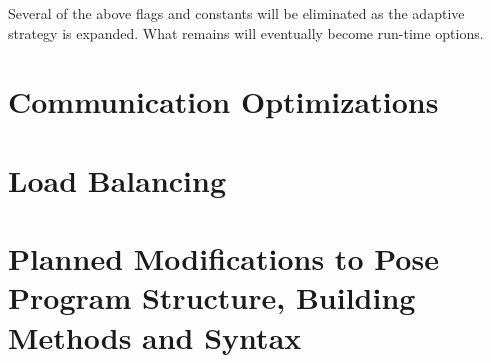 \documentclass[10pt]{article}
\newcommand{\pose}{{\sc Pose}}
\begin{document}
Several of the above flags and constants will be eliminated as the adaptive strategy is expanded.  What remains will eventually become run-time options.

\section{Communication Optimizations}

\section{Load Balancing}

\section{Planned Modifications to \pose{} Program Structure, Building Methods and Syntax}
\end{document}
